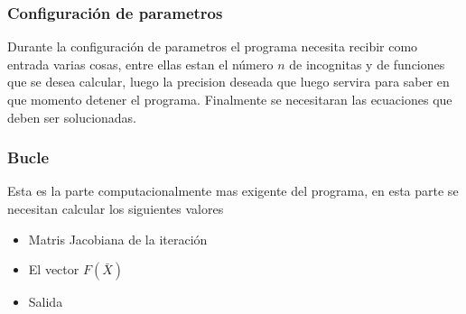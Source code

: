 \documentclass[11pt]{article}
\begin{document}
\subsubsection{Configuración de parametros}
Durante la configuración de parametros el programa necesita recibir como entrada varias cosas, entre ellas estan el número  $n$ de incognitas y de funciones que se desea calcular, luego la precision deseada que luego servira para saber en que momento detener el programa. Finalmente se necesitaran las ecuaciones que deben ser solucionadas.

\subsubsection{Bucle}
Esta es la parte computacionalmente mas exigente del programa, en esta parte se necesitan calcular los siguientes valores
\begin{itemize}
  \item Matris Jacobiana de la iteración
  \item El vector $F(\bar{X})$
  \item Salida
\end{itemize}
\clearpage

\nocite{*}

\end{document}
